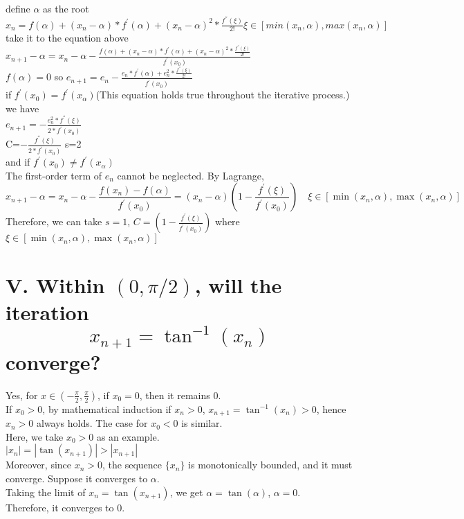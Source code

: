 \documentclass[a4paper]{article}
\begin{document}
define \(\alpha\) as the root\\
\(x_n=f(\alpha)+(x_n-\alpha)*f^{'}(\alpha)+(x_n-\alpha)^2*\frac{f^{''}(\xi)}{2!}  \xi \in [min(x_n,\alpha),max(x_n,\alpha)]\)\\
take it to the equation above\\
\(x_{n+1}-\alpha=x_n-\alpha-\frac{f(\alpha)+(x_n-\alpha)*f^{'}(\alpha)+(x_n-\alpha)^2*\frac{f^{''}(\xi)}{2!}}{f^{'}(x_0)}\)\\
\(f(\alpha)=0\)   so  \(e_{n+1}=e_n-\frac{e_n*f^{'}(\alpha)+e_n^2*\frac{f^{''}(\xi)}{2!}}{f^{'}(x_0)}\)\\
if \(f^{'}(x_0)=f^{'}(x_{\alpha}) \)(This equation holds true throughout the iterative process.) \\
we have\\
\(e_{n+1}=-\frac{e_n^2*f^{''}(\xi)}{2*f^{'}(x_0)}\)\\
C=\(-\frac{f^{''}(\xi)}{2*f^{'}(x_0)}\)  s=2\\
and if \(f^{'}(x_0) \neq f^{'}(x_{\alpha}) \)\\
The first-order term of $e_n$ cannot be neglected.
By Lagrange,\\
\[
x_{n+1}-\alpha = x_n-\alpha-\frac{f(x_n)-f(\alpha)}{f^{'}(x_0)} = (x_n-\alpha)\left(1-\frac{f^{'}(\xi)}{f^{'}(x_0)}\right) \quad \xi \in [\min(x_n,\alpha), \max(x_n,\alpha)]
\]
Therefore, we can take \( s = 1 \), \( C = \left(1-\frac{f^{'}(\xi)}{f^{'}(x_0)}\right) \) where \( \xi \in [\min(x_n,\alpha), \max(x_n,\alpha)] \)

\section*{V. Within \( (0, \pi/2) \), will the iteration
\[
x_{n+1} = \tan^{-1}(x_n)
\]
converge?}

Yes, for \( x \in \left(-\frac{\pi}{2}, \frac{\pi}{2}\right) \), if \( x_0 = 0 \), then it remains 0.\\
If \( x_0 > 0 \), by mathematical induction if \( x_n > 0 \), \( x_{n+1} = \tan^{-1}(x_n) > 0 \), hence \( x_n > 0 \) always holds. The case for \( x_0 < 0 \) is similar.\\
Here, we take \( x_0 > 0 \) as an example.\\
\( |x_n| = |\tan(x_{n+1})| > |x_{n+1}| \)\\
Moreover, since \( x_n > 0 \), the sequence \( \{x_n\} \) is monotonically bounded, and it must converge. Suppose it converges to \( \alpha \).\\
Taking the limit of \( x_n = \tan(x_{n+1}) \), we get \( \alpha = \tan(\alpha) \), \( \alpha = 0 \).\\
Therefore, it converges to 0.
\end{document}
